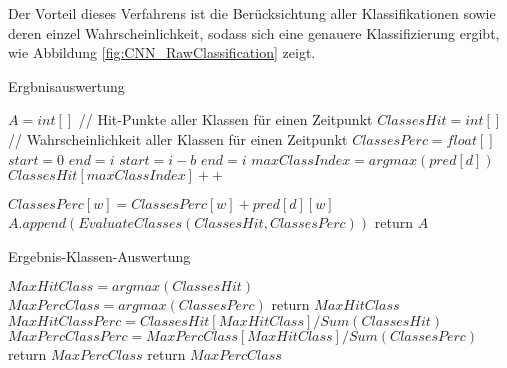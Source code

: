     Der Vorteil dieses Verfahrens ist die Berücksichtung aller Klassifikationen sowie deren einzel Wahrscheinlichkeit, sodass sich eine genauere Klassifizierung ergibt, wie Abbildung \ref{fig:CNN_RawClassification} zeigt.
    \begin{algorithm}\label{alg:Ergbnisauswertung}
        \caption{Ergbnisauswertung}
        \begin{algorithmic}[1]
            \State {}
            \State
            \State ${A} = int[ ]$
                \State
                \State // Hit-Punkte aller Klassen für einen Zeitpunkt
                \State $ClassesHit = int[ ]$
                \State // Wahrscheinlichkeit aller Klassen für einen Zeitpunkt
                \State $ClassesPerc = float[ ]$
                \State
                    \State $start = 0$
                    \State $end = i$
                \Else
                    \State $start = i - b$
                    \State $end = i$
                \EndIf
                \State
                    \State $maxClassIndex = argmax(pred[d])$
                    \State $ClassesHit[maxClassIndex]++$

                        \State $ClassesPerc[w] = ClassesPerc[w] + pred[d][w]$
                    \EndFor
                \EndFor
                \State
                \State $A.append(EvaluateClasses(ClassesHit, ClassesPerc))$
                \State
            \EndFor
            \State return $A$
        \EndFunction
        \end{algorithmic}
    \end{algorithm}
    \begin{algorithm}
        \caption{Ergebnis-Klassen-Auswertung}
        \begin{algorithmic}[1]
            \State {}
            \State
            \State $MaxHitClass = argmax(ClassesHit)$
            \State $MaxPercClass = argmax(ClassesPerc)$
            \State
                \State return $MaxHitClass$
            \Else
                \State
                \State $MaxHitClassPerc = ClassesHit[MaxHitClass] / Sum(ClassesHit) $
                \State $MaxPercClassPerc = MaxPercClass[MaxHitClass] / Sum(ClassesPerc) $
                \State
                    \State return $MaxPercClass$
                \Else
                    \State return $MaxPercClass$
                \EndIf
            \EndIf
        \EndFunction
        \end{algorithmic}
    \end{algorithm}